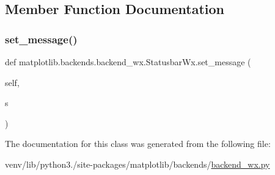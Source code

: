 \subsection{Member Function Documentation}
\mbox{\label{classmatplotlib_1_1backends_1_1backend__wx_1_1StatusbarWx_afad0e91946557ac0d8296f066581d1fd}} 
\subsubsection{\texorpdfstring{set\+\_\+message()}{set\_message()}}
{\footnotesize\ttfamily def matplotlib.\+backends.\+backend\+\_\+wx.\+Statusbar\+Wx.\+set\+\_\+message (\begin{DoxyParamCaption}\item[{}]{self,  }\item[{}]{s }\end{DoxyParamCaption})}



The documentation for this class was generated from the following file\+:\begin{DoxyCompactItemize}
\item 
venv/lib/python3./site-\/packages/matplotlib/backends/\hyperlink{backend__wx_8py}{backend\+\_\+wx.\+py}\end{DoxyCompactItemize}
